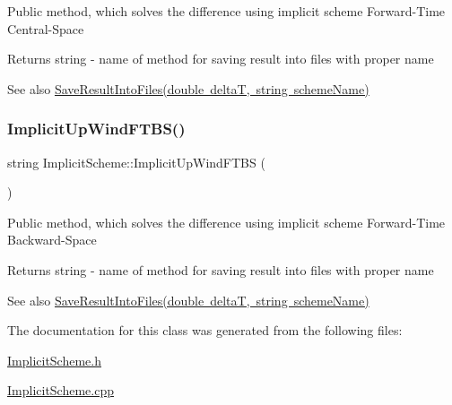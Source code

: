 Public method, which solves the difference using implicit scheme Forward-\/\+Time Central-\/\+Space \begin{DoxyReturn}{Returns}
string -\/ name of method for saving result into files with proper name 
\end{DoxyReturn}
\begin{DoxySeeAlso}{See also}
\mbox{\hyperlink{class_scheme_ae4512b4c8ead4d8ced95174f0b241f8a}{Save\+Result\+Into\+Files(double delta\+T, string scheme\+Name)}} 
\end{DoxySeeAlso}
\mbox{\label{class_implicit_scheme_ab8311a005d69690622e0ddaa0dcff94d}} 
\subsubsection{\texorpdfstring{Implicit\+Up\+Wind\+F\+T\+B\+S()}{ImplicitUpWindFTBS()}}
{\footnotesize\ttfamily string Implicit\+Scheme\+::\+Implicit\+Up\+Wind\+F\+T\+BS (\begin{DoxyParamCaption}{ }\end{DoxyParamCaption})}

Public method, which solves the difference using implicit scheme Forward-\/\+Time Backward-\/\+Space \begin{DoxyReturn}{Returns}
string -\/ name of method for saving result into files with proper name 
\end{DoxyReturn}
\begin{DoxySeeAlso}{See also}
\mbox{\hyperlink{class_scheme_ae4512b4c8ead4d8ced95174f0b241f8a}{Save\+Result\+Into\+Files(double delta\+T, string scheme\+Name)}} 
\end{DoxySeeAlso}


The documentation for this class was generated from the following files\+:\begin{DoxyCompactItemize}
\item 
\mbox{\hyperlink{_implicit_scheme_8h}{Implicit\+Scheme.\+h}}\item 
\mbox{\hyperlink{_implicit_scheme_8cpp}{Implicit\+Scheme.\+cpp}}\end{DoxyCompactItemize}
